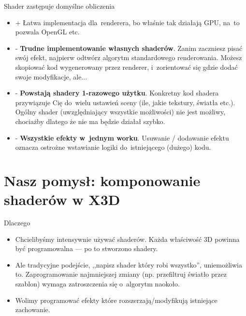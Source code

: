 \documentclass{beamer}
\begin{document}
\begin{frame}{Shader zastępuje domyślne obliczenia}

\begin{itemize}
  \item + Łatwa implementacja dla~renderera, bo właśnie tak działają GPU,
    na~to pozwala OpenGL etc.
  \item - \textbf{Trudne implementowanie własnych shaderów}.
    Zanim zaczniesz pisać swój efekt, najpierw odtwórz algorytm
    standardowego renderowania.
    Możesz skopiować kod wygenerowany przez renderer,
    i~zorientować się gdzie dodać swoje modyfikacje, ale...
  \item - \textbf{Powstają shadery 1-razowego użytku}.
    Konkretny kod shadera przywiązuje Cię do~wielu ustawień sceny
    (ile, jakie tekstury, światła etc.).
    Ogólny shader (uwzględniający wszystkie możliwości) nie jest możliwy,
    chociażby dlatego że nie ma będzie działał szybko.
  \item - \textbf{Wszystkie efekty w~jednym worku}.
    Usuwanie / dodawanie efektu oznacza ostrożne wstawianie logiki
    do~istniejącego (dużego) kodu.
\end{itemize}
\end{frame}

\section[Nasz pomysł]{Nasz pomysł: komponowanie shaderów w X3D}

\begin{frame}{Dlaczego}
\begin{itemize}
  \item Chcielibyśmy intensywnie używać shaderów. Każda właściwość 3D powinna
    być programowalna --- po to stworzono shadery.

  \item Ale tradycyjne podejście, ,,napisz shader który robi wszystko'',
    uniemożliwia to. Zaprogramowanie najmniejszej zmiany (np. przefiltruj
    światło przez szablon) wymaga zatroszczenia się o~algorytm naokoło.

  \item Wolimy programować efekty które rozszerzają/modyfikują
    istniejące zachowanie.
\end{itemize}
\end{frame}
\end{document}
